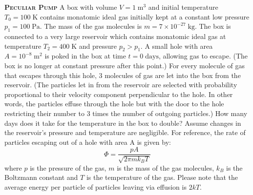 \begin{problem}{\textbf{\textsc{Peculiar Pump}}} A box with volume $V=1\;\mathrm{m}^3$ and initial temperature $T_0=100\;\mathrm{K}$ contains monatomic ideal gas initially kept at a constant low pressure $p_1=100\;\mathrm{Pa}$. The mass of the gas molecules is $m=7\times10^{-27}\;\mathrm{kg}$. The box is connected to a very large reservoir which contains monatomic ideal gas at temperature $T_2=400\;\mathrm{K}$ and pressure $p_2>p_1$. A small hole with area $A=10^{-8}\;\mathrm{m}^2$ is poked in the box at time $t=0\;\mathrm{days}$, allowing gas to escape. (The box is no longer at constant pressure after this point.) For every molecule of gas that escapes through this hole, 3 molecules of gas are let into the box from the reservoir. (The particles let in from the reservoir are selected with probability proportional to their velocity component perpendicular to the hole. In other words, the particles effuse through the hole but with the door to the hole restricting their number to 3 times the number of outgoing particles.) How many days does it take for the temperature in the box to double? Assume changes in the reservoir's pressure and temperature are negligible. For reference, the rate of particles escaping out of a hole with area A is given by:\begin{equation*}
    \Phi=\frac{pA}{\sqrt{2\pi mk_BT}}
\end{equation*}
where $p$ is the pressure of the gas, $m$ is the mass of the gas molecules, $k_B$ is the Boltzmann constant and $T$ is the temperature of the gas. Please note that the average energy per particle of particles leaving via effusion is $2kT$.

\end{problem}